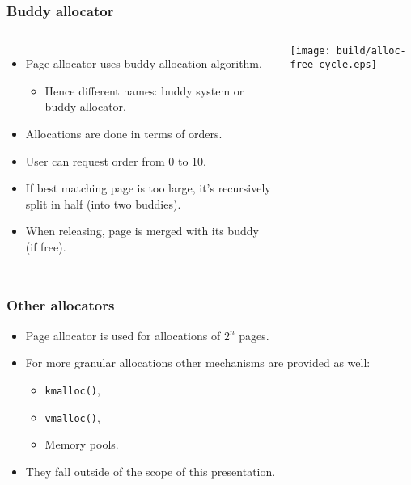 \begin{frame}
  \frametitle{Buddy allocator}
  \begin{columns}[c]

    \begin{itemize}
    \item Page allocator uses buddy allocation algorithm.
      \begin{itemize}
      \item Hence different names: buddy system or buddy allocator.
      \end{itemize}
    \item Allocations are done in terms of orders.
    \item User can request order from 0 to 10.
    \item If best matching page is too large, it's recursively split
      in half (into two buddies).
    \item When releasing, page is merged with its buddy (if free).
    \end{itemize}

    \begin{center}
    \texttt{[image: build/alloc-free-cycle.eps]}
    \end{center}
  \end{columns}
\end{frame}

\begin{frame}[fragile]
  \frametitle{Other allocators}

  \begin{itemize}
  \item Page allocator is used for allocations of $2^n$ pages.
  \item For more granular allocations other mechanisms are provided as
    well:
    \begin{itemize}
    \item \lstinline|kmalloc()|,
    \item \lstinline|vmalloc()|,
    \item Memory pools.
    \end{itemize}
  \item They fall outside of the scope of this presentation.
  \end{itemize}
\end{frame}

